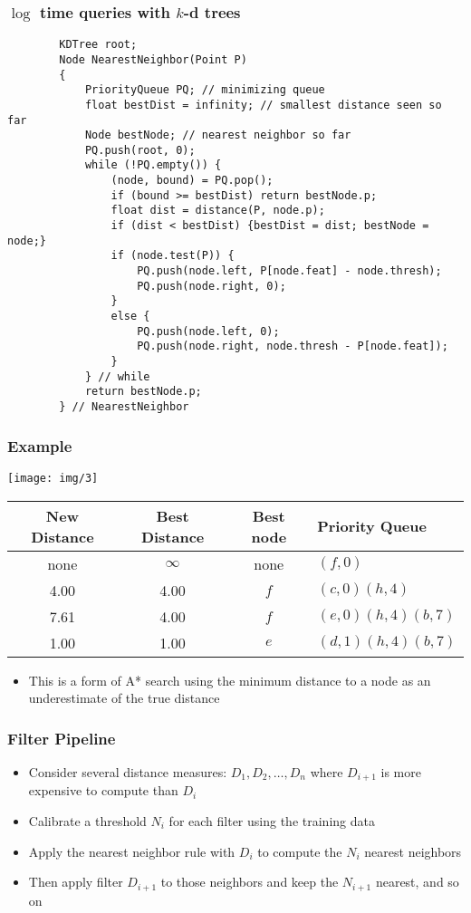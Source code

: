 \documentclass{beamer}
\newcommand*{\utb}{\item[{\texttt{[image: img/UTSymbols-Bullet.png]}}]}
\begin{document}
\begin{frame}[fragile]
    \frametitle{$\log$ time queries with $k$-d trees}
    \begin{lstlisting}
        KDTree root;
        Node NearestNeighbor(Point P)
        {
            PriorityQueue PQ; // minimizing queue
            float bestDist = infinity; // smallest distance seen so far
            Node bestNode; // nearest neighbor so far
            PQ.push(root, 0);
            while (!PQ.empty()) {
                (node, bound) = PQ.pop();
                if (bound >= bestDist) return bestNode.p;
                float dist = distance(P, node.p);
                if (dist < bestDist) {bestDist = dist; bestNode = node;}
                if (node.test(P)) {
                    PQ.push(node.left, P[node.feat] - node.thresh);
                    PQ.push(node.right, 0);
                }
                else {
                    PQ.push(node.left, 0);
                    PQ.push(node.right, node.thresh - P[node.feat]);
                }
            } // while
            return bestNode.p;
        } // NearestNeighbor
    \end{lstlisting}
\end{frame}

\begin{frame}
    \frametitle{Example}
    \begin{center}
        \texttt{[image: img/3]}
        \begin{tabular}{|c|c|c|l|}
            \hline
            New Distance & Best Distance & Best node & Priority Queue \\
            \hline
            none & $\infty$ & none & $(f,0)$ \\ \hline
            4.00 & 4.00 & $f$ & $(c,0) (h,4)$ \\ \hline
            7.61 & 4.00 & $f$ & $(e,0) (h,4) (b,7)$ \\ \hline
            1.00 & 1.00 & $e$ & $(d,1) (h,4) (b,7)$ \\ \hline
        \end{tabular}
    \end{center}
    \begin{itemize}
        \utb This is a form of A* search using the minimum distance to a node as an underestimate of the true distance
    \end{itemize}
\end{frame}

\begin{frame}
    \frametitle{Filter Pipeline}
    \begin{itemize}
        \utb Consider several distance measures: $D_1, D_2, \dots, D_n$ where $D_{i+1}$ is more expensive to compute than $D_i$
        \utb Calibrate a threshold $N_i$ for each filter using the training data
        \utb Apply the nearest neighbor rule with $D_i$ to compute the $N_i$ nearest neighbors
        \utb Then apply filter $D_{i+1}$ to those neighbors and keep the $N_{i+1}$ nearest, and so on
    \end{itemize}
\end{frame}
\end{document}
